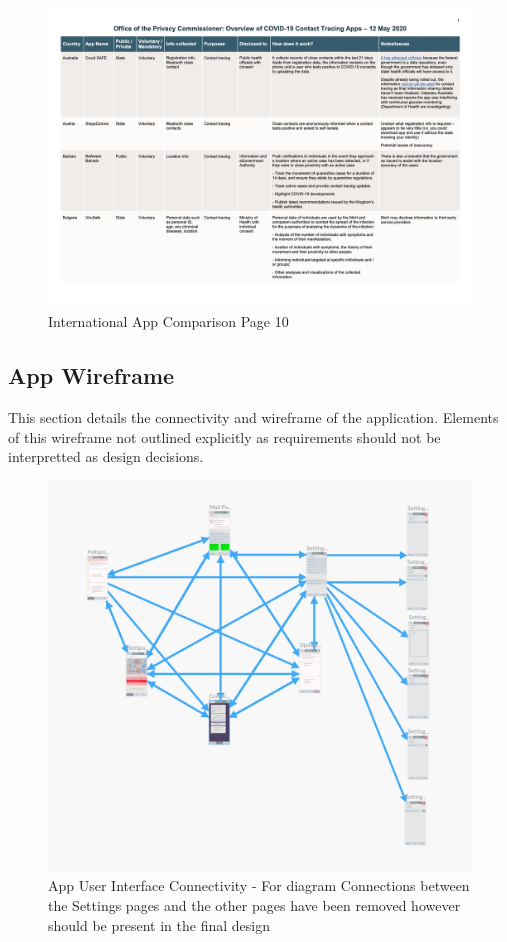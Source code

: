 \documentclass{scrreprt}
\begin{document}
\begin{figure}[H]
	\centering
	\includegraphics[page=10, width=0.9\linewidth]{2020-05-12-OPC-Comparison-of-COVID-19-Apps-colours}
	\caption{International App Comparison Page 10}
	\label{fig:10_2020-05-12-OPC-Comparison-of-COVID-19-Apps-colours}
\end{figure}


\subsection{App Wireframe}\label{wireframe}
This section details the connectivity and wireframe of the application. Elements of this wireframe not outlined explicitly as requirements should not be interpretted as design decisions.

\begin{figure}[H]
	\centering
	\includegraphics[page=1, width=0.9\linewidth]{COMP30830-AppUIWireFrame}
	\caption{App User Interface Connectivity - For diagram Connections between the Settings pages and the other pages have been removed however should be present in the final design}
	\label{UIConnectivity}
\end{figure}
\end{document}
